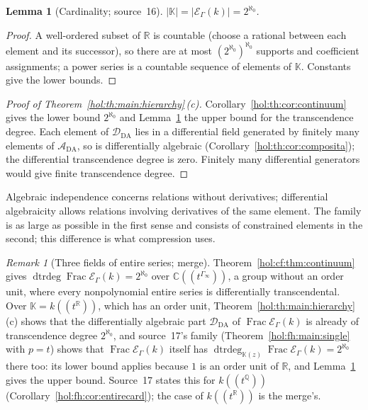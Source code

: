 \documentclass[11pt]{article}
\numberwithin{equation}{section}
\newtheorem{lemma}[theorem]{Lemma}
\theoremstyle{definition}
\theoremstyle{remark}
\newtheorem{remark}[theorem]{Remark}
\newcommand{\C}{\mathbb C}
\newcommand{\R}{\mathbb R}
\newcommand{\Q}{\mathbb Q}
\newcommand{\abs}[1]{\lvert#1\rvert}
\newcommand{\KK}{\mathbb K}
\newcommand{\EK}{\mathcal E_\Gamma(k)}
\newcommand{\FE}{\operatorname{Frac}\EK}
\newcommand{\dtrdeg}{\operatorname{dtrdeg}}
\begin{document}
\begin{lemma}[Cardinality; source~16]\label{hol:th:lem:card}
$\abs{\KK}=\abs{\EK}=2^{\aleph_0}$.
\end{lemma}

\begin{proof}
A well-ordered subset of $\R$ is countable (choose a rational between each
element and its successor), so there are at most $(2^{\aleph_0})^{\aleph_0}$
supports and coefficient assignments; a power series is a countable sequence
of elements of $\KK$. Constants give the lower bounds.
\end{proof}

\begin{proof}[Proof of Theorem~\ref{hol:th:main:hierarchy}\,\textup{(c)}]
Corollary~\ref{hol:th:cor:continuum} gives the lower bound $2^{\aleph_0}$ and
Lemma~\ref{hol:th:lem:card} the upper bound for the transcendence degree.
Each element of $\mathcal D_{\mathrm{DA}}$ lies in a differential field
generated by finitely many elements of $\mathcal A_{\mathrm{DA}}$, so is
differentially algebraic (Corollary~\ref{hol:th:cor:composita}); the
differential transcendence degree is zero. Finitely many differential
generators would give finite transcendence degree.
\end{proof}

Algebraic independence concerns relations without derivatives; differential
algebraicity allows relations involving derivatives of the same element.
The family is as large as possible in the first sense and consists of
constrained elements in the second; this difference is what compression uses.

\begin{remark}[Three fields of entire series; merge]\label{hol:th:rem:fields}
Theorem~\ref{hol:cf:thm:continuum} gives
$\dtrdeg\FE=2^{\aleph_0}$ over $\C((t^{\Gamma_\infty}))$, a group without an
order unit, where every nonpolynomial entire series is differentially
transcendental. Over $\KK=k((t^\R))$, which has an order unit,
Theorem~\ref{hol:th:main:hierarchy}\,(c) shows that the differentially
algebraic part $\mathcal D_{\mathrm{DA}}$ of $\FE$ is already of transcendence
degree $2^{\aleph_0}$, and source~17's family (Theorem~\ref{hol:fh:main:single}
with $p=t$) shows that $\FE$ itself has $\dtrdeg_{\KK(z)}\FE=2^{\aleph_0}$ there
too: its lower bound applies because $1$ is an order unit of $\R$, and
Lemma~\ref{hol:th:lem:card} gives the upper bound. Source~17 states this for
$k((t^\Q))$ (Corollary~\ref{hol:fh:cor:entirecard}); the case of $k((t^\R))$ is
the merge's.
\end{remark}
\end{document}
